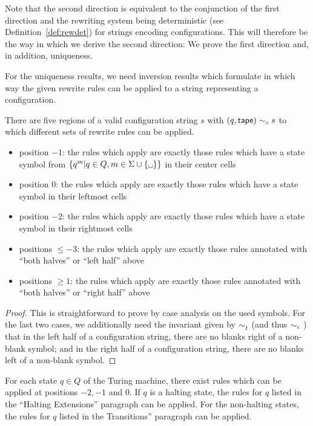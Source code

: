 \documentclass[a4paper,UKenglish,cleveref, autoref]{lipics-v2019}
\begin{document}
Note that the second direction is equivalent to the conjunction of the first direction and the rewriting system being deterministic (see Definition~\ref{def:rewdet}) for strings encoding configurations. This will therefore be the way in which we derive the second direction: We prove the first direction and, in addition, uniqueness.

For the uniqueness results, we need inversion results which formulate in which way the given rewrite rules can be applied to a string representing a configuration. 

\begin{lemma}
  There are five regions of a valid configuration string $s$ with $(q, \textsf{tape}) \sim_c{} s$ to which different sets of rewrite rules can be applied.
  \begin{itemize}
    \item position $-1$: the rules which apply are exactly those rules which have a state symbol from $\{q^m | q \in Q, m \in \Sigma \cup \{\blank \}\}$ in their center cells
    \item position $0$: the rules which apply are exactly those rules which have a state symbol in their leftmost cells
    \item position $-2$: the rules which apply are exactly those rules which have a state symbol in their rightmost cells
    \item positions $\le -3$: the rules which apply are exactly those rules annotated with  ``both halves'' or ``left half'' above
    \item positions $\ge 1$: the rules which apply are exactly those rules annotated with ``both halves'' or ``right half'' above
  \end{itemize}
\end{lemma}
\begin{proof}
  This is straightforward to prove by case analysis on the used symbols. For the last two cases, we additionally need the invariant given by $\sim_t^{}$ (and thus $\sim_c{}$) that in the left half of a configuration string, there are no blanks right of a non-blank symbol; and in the right half of a configuration string, there are no blanks left of a non-blank symbol.
\end{proof}

\begin{lemma}
  For each state $q \in Q$ of the Turing machine, there exist rules which can be applied at positions $-2, -1$ and $0$. If $q$ is a halting state, the rules for $q$ listed in the ``Halting Extensions'' paragraph can be applied. For the non-halting states, the rules for $q$ listed in the Transitions'' paragraph can be applied.
\end{lemma}
\end{document}
